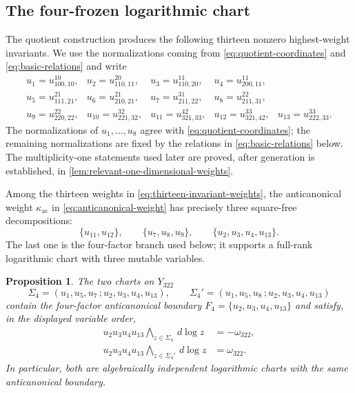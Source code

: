 \documentclass[11pt,reqno]{amsart}
\numberwithin{equation}{section}
\newtheorem{proposition}[proposition]{Proposition}
\theoremstyle{remark}
\newcommand{\dlog}{\,d\!\log}
\begin{document}
\subsection{The four-frozen logarithmic chart}

The quotient construction produces the following thirteen nonzero
highest-weight invariants.  We use the normalizations coming from
\eqref{eq:quotient-coordinates} and \eqref{eq:basic-relations} and write
\begin{equation}
\label{eq:thirteen-invariant-weights}
\begin{array}{lllll}
 u_1=u_{100,10}^{10},&u_2=u_{110,11}^{20},&u_3=u_{110,20}^{11},&u_4=u_{200,11}^{11},\\
 u_5=u_{111,21}^{21},&u_6=u_{210,21}^{21},&u_7=u_{211,22}^{31},&u_8=u_{211,31}^{22},\\
 u_9=u_{220,22}^{22},&u_{10}=u_{221,32}^{32},&u_{11}=u_{321,33}^{42},&u_{12}=u_{321,42}^{33},&u_{13}=u_{222,33}^{33}.
\end{array}
\end{equation}
The normalizations of $u_1,\ldots,u_8$ agree with
\eqref{eq:quotient-coordinates}; the remaining normalizations are fixed by
the relations in \eqref{eq:basic-relations} below.  The multiplicity-one
statements used later are proved, after generation is established, in
\cref{lem:relevant-one-dimensional-weights}.

Among the thirteen weights in \eqref{eq:thirteen-invariant-weights}, the
anticanonical weight $\kappa_{\mathrm{ac}}$ in
\eqref{eq:anticanonical-weight} has precisely three
square-free decompositions:
\[ \{u_{11},u_{12}\}, \qquad \{u_7,u_8,u_9\}, \qquad \{u_2,u_3,u_4,u_{13}\}. \]
The last one is the four-factor branch used below; it supports a full-rank logarithmic chart with three mutable variables.

\begin{proposition}
\label{prop:volume-selected-seed}
The two charts on $Y_{322}$
\[ \Sigma_4=(u_1,u_5,u_7\,;u_2,u_3,u_4,u_{13}), \qquad \Sigma_4'=(u_1,u_5,u_8\,;u_2,u_3,u_4,u_{13}) \]
contain the four-factor anticanonical boundary
$F_4=\{u_2,u_3,u_4,u_{13}\}$ and satisfy, in the displayed variable
order,
\begin{equation}
\label{eq:two-volume-identities}
 \begin{aligned}
 u_2u_3u_4u_{13}\bigwedge_{z\in\Sigma_4}\dlog z
 &=-\omega_{322},\\
 u_2u_3u_4u_{13}\bigwedge_{z\in\Sigma_4'}\dlog z
 &=\omega_{322}.
 \end{aligned}
\end{equation}
In particular, both are algebraically independent logarithmic charts with
the same anticanonical boundary.
\end{proposition}
\end{document}
